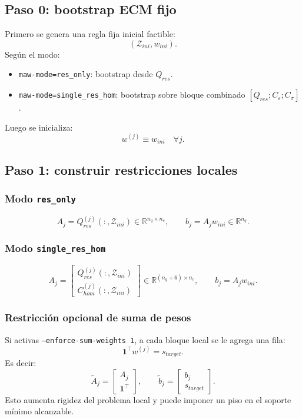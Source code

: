 \documentclass[11pt,a4paper]{article}
\begin{document}
\subsection{Paso 0: bootstrap ECM fijo}
Primero se genera una regla fija inicial factible:
\[
(\mathcal Z_{ini},w_{ini}).
\]
Según el modo:
\begin{itemize}[leftmargin=1.5em]
\item \texttt{maw-mode=res\_only}: bootstrap desde $Q_{res}$.
\item \texttt{maw-mode=single\_res\_hom}: bootstrap sobre bloque combinado
$[Q_{res};C_\varepsilon;C_\sigma]$.
\end{itemize}
Luego se inicializa:
\[
w^{(j)}\equiv w_{ini}\quad \forall j.
\]

\subsection{Paso 1: construir restricciones locales}
\subsubsection*{Modo \texttt{res\_only}}
\[
A_j = Q_{res}^{(j)}(:,\mathcal Z_{ini})\in\mathbb{R}^{n_q\times n_c},
\qquad
b_j = A_jw_{ini}\in\mathbb{R}^{n_q}.
\]

\subsubsection*{Modo \texttt{single\_res\_hom}}
\[
A_j=
\begin{bmatrix}
Q_{res}^{(j)}(:,\mathcal Z_{ini})\\
C_{hom}^{(j)}(:,\mathcal Z_{ini})
\end{bmatrix}
\in\mathbb{R}^{(n_q+6)\times n_c},
\qquad
b_j=A_jw_{ini}.
\]

\subsubsection*{Restricción opcional de suma de pesos}
Si activas \texttt{--enforce-sum-weights 1}, a cada bloque local se le agrega una fila:
\[
\mathbf{1}^\top w^{(j)} = s_{target}.
\]
Es decir:
\[
\widetilde A_j=
\begin{bmatrix}
A_j\\
\mathbf{1}^\top
\end{bmatrix},
\qquad
\widetilde b_j=
\begin{bmatrix}
b_j\\
s_{target}
\end{bmatrix}.
\]
Esto aumenta rigidez del problema local y puede imponer un piso en el soporte mínimo alcanzable.
\end{document}
